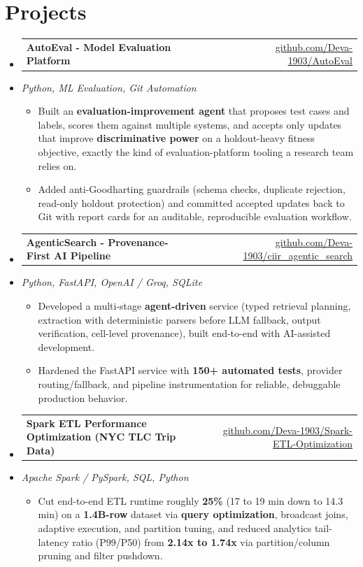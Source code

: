 \documentclass[letterpaper,10pt]{article}
\makeatletter
\newcommand{\resumeItem}[1]{
  \item\small{#1\vspace{-1pt}}
}
\newcommand{\resumeProjectHeading}[2]{
    \item
    \begin{tabular*}{0.985\textwidth}[t]{l@{\extracolsep{\fill}}r}
      \small\textbf{#1} & \small #2 \\
    \end{tabular*}\vspace{-5pt}
}
\newcommand{\resumeProjectSubheading}[1]{
  \vspace{-2pt}\item[] {\small\textcolor{ResumeSlate}{\emph{#1}}}\vspace{-3pt}
}
\newcommand{\resumeSubHeadingListStart}{\begin{itemize}[leftmargin=0.0in, label={}, itemsep=2pt, topsep=2pt]}
\newcommand{\resumeSubHeadingListEnd}{\end{itemize}}
\newcommand{\resumeItemListStart}{\begin{itemize}[leftmargin=0.18in, itemsep=2pt, topsep=1pt]}
\newcommand{\resumeItemListEnd}{\end{itemize}\vspace{-4pt}}
\makeatother
\begin{document}
\section{Projects}
\resumeSubHeadingListStart
  \resumeProjectHeading
    {AutoEval - Model Evaluation Platform}
    {\href{https://github.com/Deva-1903/AutoEval}{github.com/Deva-1903/AutoEval}}
  \resumeProjectSubheading{Python, ML Evaluation, Git Automation}
    \resumeItemListStart
      \resumeItem{Built an \textbf{evaluation-improvement agent} that proposes test cases and labels, scores them against multiple systems, and accepts only updates that improve \textbf{discriminative power} on a holdout-heavy fitness objective, exactly the kind of evaluation-platform tooling a research team relies on.}
      \resumeItem{Added anti-Goodharting guardrails (schema checks, duplicate rejection, read-only holdout protection) and committed accepted updates back to Git with report cards for an auditable, reproducible evaluation workflow.}
    \resumeItemListEnd
  \resumeProjectHeading
    {AgenticSearch - Provenance-First AI Pipeline}
    {\href{https://github.com/Deva-1903/ciir_agentic_search}{github.com/Deva-1903/ciir\_agentic\_search}}
  \resumeProjectSubheading{Python, FastAPI, OpenAI / Groq, SQLite}
    \resumeItemListStart
      \resumeItem{Developed a multi-stage \textbf{agent-driven} service (typed retrieval planning, extraction with deterministic parsers before LLM fallback, output verification, cell-level provenance), built end-to-end with AI-assisted development.}
      \resumeItem{Hardened the FastAPI service with \textbf{150+ automated tests}, provider routing/fallback, and pipeline instrumentation for reliable, debuggable production behavior.}
    \resumeItemListEnd
  \resumeProjectHeading
    {Spark ETL Performance Optimization (NYC TLC Trip Data)}
    {\href{https://github.com/Deva-1903/Spark-ETL-Optimization}{github.com/Deva-1903/Spark-ETL-Optimization}}
  \resumeProjectSubheading{Apache Spark / PySpark, SQL, Python}
    \resumeItemListStart
      \resumeItem{Cut end-to-end ETL runtime roughly \textbf{25\%} (17 to 19 min down to 14.3 min) on a \textbf{1.4B-row} dataset via \textbf{query optimization}, broadcast joins, adaptive execution, and partition tuning, and reduced analytics tail-latency ratio (P99/P50) from \textbf{2.14x to 1.74x} via partition/column pruning and filter pushdown.}
    \resumeItemListEnd
\resumeSubHeadingListEnd
\vspace{-4pt}
\end{document}
